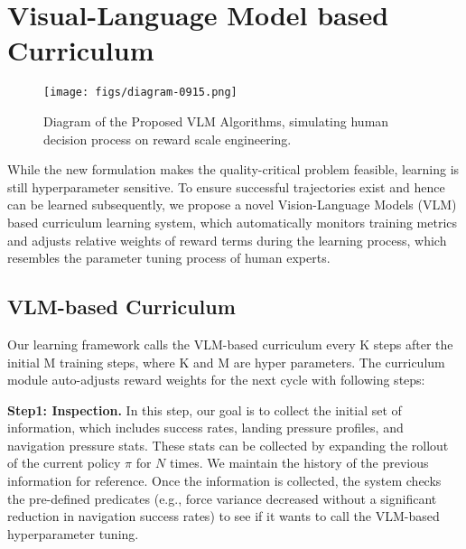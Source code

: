 \section{Visual-Language Model based Curriculum} \label{sec:vlm}

\begin{figure*}[t]
  \centering
    \texttt{[image: figs/diagram-0915.png]}
  \caption{Diagram of the Proposed VLM Algorithms, simulating human decision process on reward scale engineering.
  }
  \label{fig:alog}
  \vspace{-1.5em}
\end{figure*}


While the new formulation makes the quality-critical problem feasible, learning is still hyperparameter sensitive.
To ensure successful trajectories exist and hence can be learned subsequently, we propose a novel Vision-Language Models (VLM) based curriculum learning system, which automatically monitors training metrics and adjusts relative weights of reward terms during the learning process, which resembles the parameter tuning process of human experts.








\subsection{VLM-based Curriculum}

Our learning framework calls the VLM-based curriculum every K steps after the initial M training steps, where K and M are hyper parameters.
The curriculum module auto-adjusts reward weights
for the next cycle with following steps:

\textbf{Step1: Inspection.} In this step, our goal is to collect the initial set of information, which includes success rates, landing pressure profiles, and navigation pressure stats. These stats can be collected by expanding the rollout of the current policy $\pi$ for $N$ times. We maintain the history of the previous information for reference. Once the information is collected, the system checks the pre-defined predicates (e.g., force variance decreased without a significant reduction in navigation success rates) to see if it wants to call the VLM-based hyperparameter tuning.


